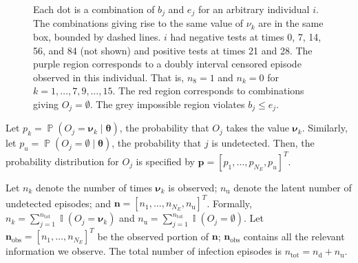\documentclass[12pt]{article}
\DeclareMathOperator{\prob}{\mathbb{P}}
\DeclareMathOperator{\indicator}{\mathbb{I}}
\renewcommand{\vec}[1]{\bm{#1}}
\newcommand{\ntot}{n_\text{tot}}
\newcommand{\ndet}{n_\text{d}}
\newcommand{\nnodet}{n_\text{u}}
\newcommand{\na}{\vec{n}_\text{obs}}
\begin{document}
\begin{figure}
    \caption[Episode regions]{%
      Each dot is a combination of $b_j$ and $e_j$ for an arbitrary individual $i$.
      The combinations giving rise to the same value of $\nu_k$ are in the same box, bounded by dashed lines.
      $i$ had negative tests at times 0, 7, 14, 56, and 84 (not shown) and positive tests at times 21 and 28.
      The purple region corresponds to a doubly interval censored episode observed in this individual.
      That is, $n_8 = 1$ and $n_k = 0$ for $k = 1, \dots, 7, 9, \dots, 15$.
      The red region corresponds to combinations giving $O_j = \emptyset$.
      The grey impossible region violates $b_j \leq e_j$.
    }
    \label{perf-test:fig:partitionSpace}
\end{figure}

Let $p_k = \prob(O_j = \vec{\nu}_k \mid \vec{\theta})$, the probability that $O_j$ takes the value $\vec{\nu}_k$.
Similarly, let $p_u = \prob(O_j = \emptyset \mid \vec{\theta})$, the probability that $j$ is undetected.
Then, the probability distribution for $O_j$ is specified by $\vec{p} = [p_1, \dots, p_{N_E}, p_u]^T$.

Let $n_k$ denote the number of times $\vec{\nu}_k$ is observed; $\nnodet$ denote the latent number of undetected episodes; and $\vec{n} = [n_1, \dots, n_{N_E}, \nnodet]^T$.
Formally, $n_k = \sum_{j=1}^{\ntot} \indicator(O_j = \vec{\nu}_k)$ and $\nnodet = \sum_{j=1}^{\ntot} \indicator(O_j = \emptyset)$.
Let $\na = [n_{1}, \dots, n_{N_E}]^T$ be the observed portion of $\vec{n}$; $\na$ contains all the relevant information we observe.
The total number of infection episodes is $\ntot = \ndet + \nnodet$.
\end{document}
